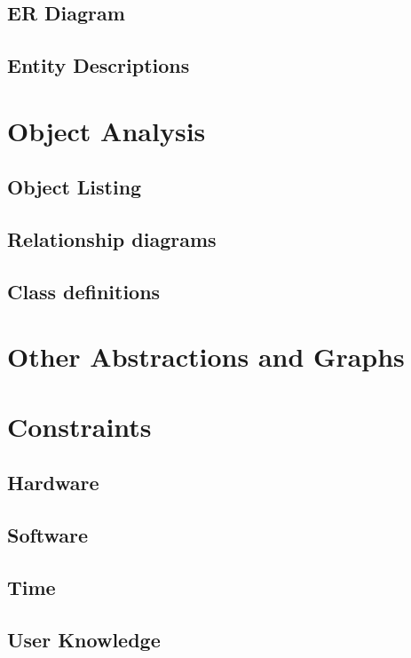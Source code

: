\subsection{ER Diagram}

\subsection{Entity Descriptions}

\section{Object Analysis}

\subsection{Object Listing}

\subsection{Relationship diagrams}

\subsection{Class definitions}

\section{Other Abstractions and Graphs}

\section{Constraints}

\subsection{Hardware}

\subsection{Software}

\subsection{Time}

\subsection{User Knowledge}

